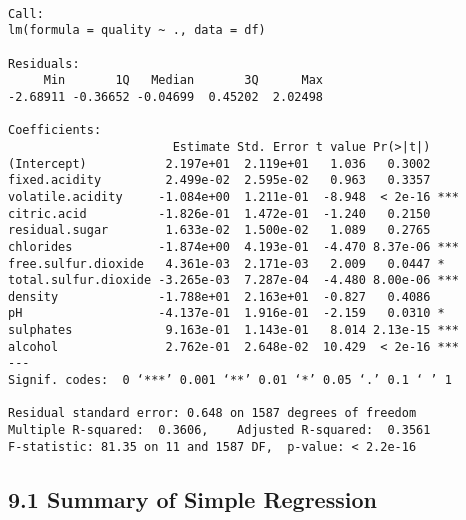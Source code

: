 \documentclass[11pt]{article}
\begin{document}
    
    \begin{verbatim}

Call:
lm(formula = quality ~ ., data = df)

Residuals:
     Min       1Q   Median       3Q      Max 
-2.68911 -0.36652 -0.04699  0.45202  2.02498 

Coefficients:
                       Estimate Std. Error t value Pr(>|t|)    
(Intercept)           2.197e+01  2.119e+01   1.036   0.3002    
fixed.acidity         2.499e-02  2.595e-02   0.963   0.3357    
volatile.acidity     -1.084e+00  1.211e-01  -8.948  < 2e-16 ***
citric.acid          -1.826e-01  1.472e-01  -1.240   0.2150    
residual.sugar        1.633e-02  1.500e-02   1.089   0.2765    
chlorides            -1.874e+00  4.193e-01  -4.470 8.37e-06 ***
free.sulfur.dioxide   4.361e-03  2.171e-03   2.009   0.0447 *  
total.sulfur.dioxide -3.265e-03  7.287e-04  -4.480 8.00e-06 ***
density              -1.788e+01  2.163e+01  -0.827   0.4086    
pH                   -4.137e-01  1.916e-01  -2.159   0.0310 *  
sulphates             9.163e-01  1.143e-01   8.014 2.13e-15 ***
alcohol               2.762e-01  2.648e-02  10.429  < 2e-16 ***
---
Signif. codes:  0 ‘***’ 0.001 ‘**’ 0.01 ‘*’ 0.05 ‘.’ 0.1 ‘ ’ 1

Residual standard error: 0.648 on 1587 degrees of freedom
Multiple R-squared:  0.3606,	Adjusted R-squared:  0.3561 
F-statistic: 81.35 on 11 and 1587 DF,  p-value: < 2.2e-16

    \end{verbatim}

    
    \hypertarget{summary-of-simple-regression}{%
\subsection{9.1 Summary of Simple
Regression}\label{summary-of-simple-regression}}
\end{document}
